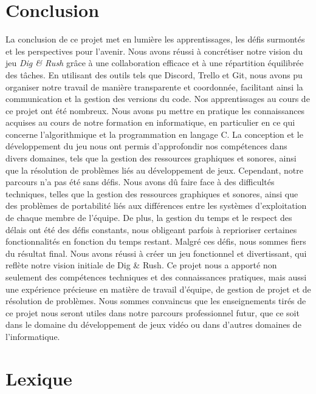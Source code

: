 \documentclass[a4paper,12pt]{article}
\begin{document}
\section{Conclusion}

La conclusion de ce projet met en lumière les apprentissages, les défis surmontés et les perspectives pour l'avenir. Nous avons réussi à concrétiser notre vision du jeu \textit{Dig \& Rush} grâce à une collaboration efficace et à une répartition équilibrée des tâches. En utilisant des outils tels que Discord, Trello et Git, nous avons pu organiser notre travail de manière transparente et coordonnée, facilitant ainsi la communication et la gestion des versions du code.
Nos apprentissages au cours de ce projet ont été nombreux. Nous avons pu mettre en pratique les connaissances acquises au cours de notre formation en informatique, en particulier en ce qui concerne l'algorithmique et la programmation en langage C. La conception et le développement du jeu nous ont permis d'approfondir nos compétences dans divers domaines, tels que la gestion des ressources graphiques et sonores, ainsi que la résolution de problèmes liés au développement de jeux.
Cependant, notre parcours n'a pas été sans défis. Nous avons dû faire face à des difficultés techniques, telles que la gestion des ressources graphiques et sonores, ainsi que des problèmes de portabilité liés aux différences entre les systèmes d'exploitation de chaque membre de l'équipe. De plus, la gestion du temps et le respect des délais ont été des défis constants, nous obligeant parfois à reprioriser certaines fonctionnalités en fonction du temps restant.
Malgré ces défis, nous sommes fiers du résultat final. Nous avons réussi à créer un jeu fonctionnel et divertissant, qui reflète notre vision initiale de Dig \& Rush. Ce projet nous a apporté non seulement des compétences techniques et des connaissances pratiques, mais aussi une expérience précieuse en matière de travail d'équipe, de gestion de projet et de résolution de problèmes. Nous sommes convaincus que les enseignements tirés de ce projet nous seront utiles dans notre parcours professionnel futur, que ce soit dans le domaine du développement de jeux vidéo ou dans d'autres domaines de l'informatique.

\newpage
\appendix

\section{Lexique}
\end{document}
